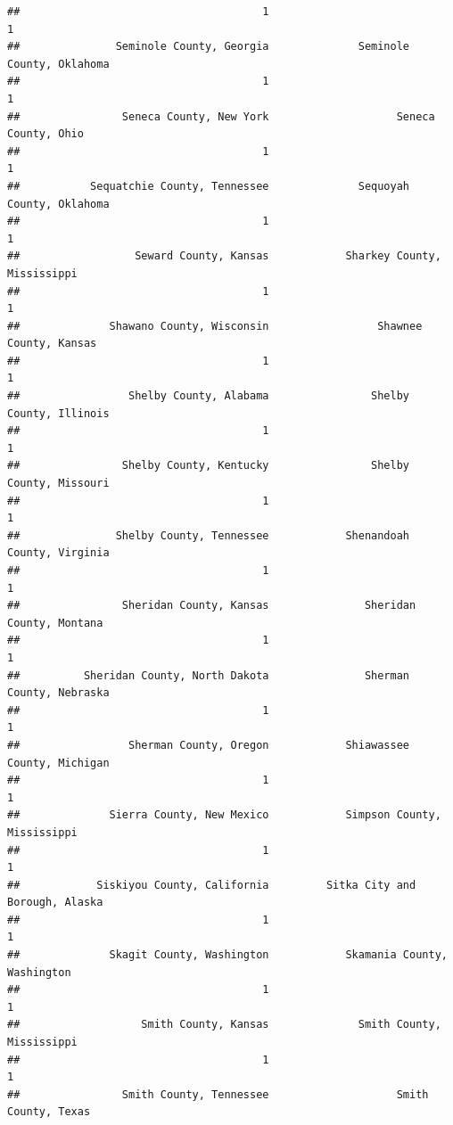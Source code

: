\documentclass[
]{article}
\begin{document}
\begin{verbatim}
##                                      1                                      1 
##               Seminole County, Georgia              Seminole County, Oklahoma 
##                                      1                                      1 
##                Seneca County, New York                    Seneca County, Ohio 
##                                      1                                      1 
##           Sequatchie County, Tennessee              Sequoyah County, Oklahoma 
##                                      1                                      1 
##                  Seward County, Kansas            Sharkey County, Mississippi 
##                                      1                                      1 
##              Shawano County, Wisconsin                 Shawnee County, Kansas 
##                                      1                                      1 
##                 Shelby County, Alabama                Shelby County, Illinois 
##                                      1                                      1 
##                Shelby County, Kentucky                Shelby County, Missouri 
##                                      1                                      1 
##               Shelby County, Tennessee            Shenandoah County, Virginia 
##                                      1                                      1 
##                Sheridan County, Kansas               Sheridan County, Montana 
##                                      1                                      1 
##          Sheridan County, North Dakota               Sherman County, Nebraska 
##                                      1                                      1 
##                 Sherman County, Oregon            Shiawassee County, Michigan 
##                                      1                                      1 
##              Sierra County, New Mexico            Simpson County, Mississippi 
##                                      1                                      1 
##            Siskiyou County, California         Sitka City and Borough, Alaska 
##                                      1                                      1 
##              Skagit County, Washington            Skamania County, Washington 
##                                      1                                      1 
##                   Smith County, Kansas              Smith County, Mississippi 
##                                      1                                      1 
##                Smith County, Tennessee                    Smith County, Texas 

\end{verbatim}
\end{document}
